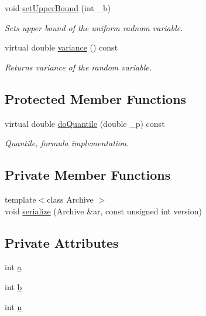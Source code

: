 \begin{DoxyCompactItemize}
void \hyperlink{class_c_uniform_d_r_v_af49b510284ccaa96f370e90200c8597d}{set\-Upper\-Bound} (int \-\_\-b)
\begin{DoxyCompactList}\small\item\em Sets upper bound of the uniform radnom variable. \end{DoxyCompactList}\item 
virtual double \hyperlink{class_c_uniform_d_r_v_a759aca373487c4f7194e5a07473cd6ed}{variance} () const 
\begin{DoxyCompactList}\small\item\em Returns variance of the random variable. \end{DoxyCompactList}\end{DoxyCompactItemize}
\subsection*{Protected Member Functions}
\begin{DoxyCompactItemize}
\item 
virtual double \hyperlink{class_c_uniform_d_r_v_aabceef44c94b875240c901349644b191}{do\-Quantile} (double \-\_\-p) const 
\begin{DoxyCompactList}\small\item\em Quantile, formula implementation. \end{DoxyCompactList}\end{DoxyCompactItemize}
\subsection*{Private Member Functions}
\begin{DoxyCompactItemize}
\item 
{\footnotesize template$<$class Archive $>$ }\\void \hyperlink{class_c_uniform_d_r_v_a359f0d33f2524fb33f2b5bc8c7dd474e}{serialize} (Archive \&ar, const unsigned int version)
\end{DoxyCompactItemize}
\subsection*{Private Attributes}
\begin{DoxyCompactItemize}
\item 
int \hyperlink{class_c_uniform_d_r_v_a27e69eec5f473918bb39e5878a9b8983}{a}
\item 
int \hyperlink{class_c_uniform_d_r_v_a67e7c41484fd23c788b612af61797992}{b}
\item 
int \hyperlink{class_c_uniform_d_r_v_a9a5ada91bbce53c6b3eb01179eae1537}{n}
\end{DoxyCompactItemize}
